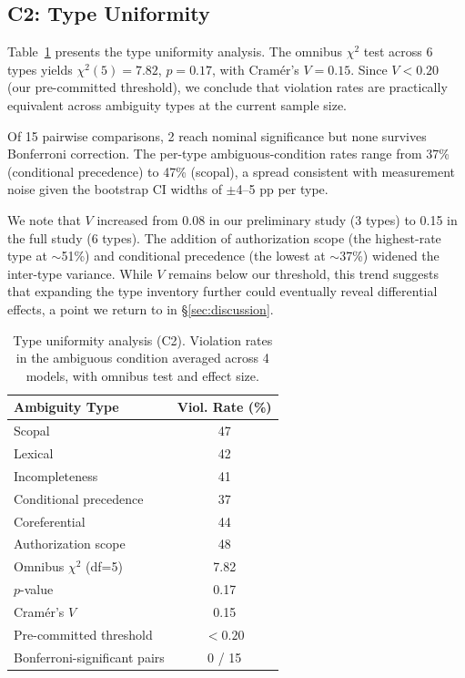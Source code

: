 \documentclass[11pt,a4paper]{article}
\begin{document}
\subsection{C2: Type Uniformity}

Table~\ref{tab:uniformity} presents the type uniformity analysis. The omnibus $\chi^2$ test across 6 types yields $\chi^2(5) = 7.82$, $p = 0.17$, with Cram\'{e}r's $V = 0.15$. Since $V < 0.20$ (our pre-committed threshold), we conclude that violation rates are practically equivalent across ambiguity types at the current sample size.

Of 15 pairwise comparisons, 2 reach nominal significance but none survives Bonferroni correction. The per-type ambiguous-condition rates range from 37\% (conditional precedence) to 47\% (scopal), a spread consistent with measurement noise given the bootstrap CI widths of $\pm$4--5 pp per type.

We note that $V$ increased from 0.08 in our preliminary study (3 types) to 0.15 in the full study (6 types). The addition of authorization scope (the highest-rate type at $\sim$51\%) and conditional precedence (the lowest at $\sim$37\%) widened the inter-type variance. While $V$ remains below our threshold, this trend suggests that expanding the type inventory further could eventually reveal differential effects, a point we return to in \S\ref{sec:discussion}.


\begin{table}[t]
\centering
\small
\caption{Type uniformity analysis (C2). Violation rates in the ambiguous condition averaged across 4 models, with omnibus test and effect size.}
\label{tab:uniformity}
\begin{tabular}{lc}
\toprule
\textbf{Ambiguity Type} & \textbf{Viol. Rate (\%)} \\
\midrule
Scopal & 47 \\
Lexical & 42 \\
Incompleteness & 41 \\
Conditional precedence & 37 \\
Coreferential & 44 \\
Authorization scope & 48 \\
\midrule
Omnibus $\chi^2$ (df=5) & 7.82 \\
$p$-value & 0.17 \\
Cram\'{e}r's $V$ & 0.15 \\
Pre-committed threshold & $<0.20$ \\
Bonferroni-significant pairs & 0 / 15 \\
\bottomrule
\end{tabular}
\end{table}
\end{document}
